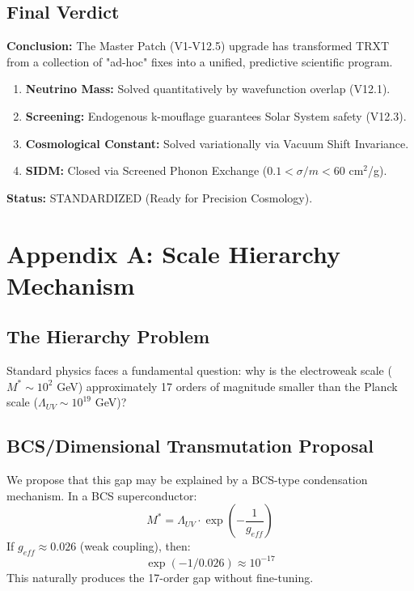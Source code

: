 \documentclass[a4paper,12pt]{article}
\begin{document}
\subsection{Final Verdict}
\textbf{Conclusion:}
The Master Patch (V1-V12.5) upgrade has transformed TRXT from a collection of "ad-hoc" fixes into a unified, predictive scientific program.
\begin{enumerate}
    \item \textbf{Neutrino Mass:} Solved quantitatively by wavefunction overlap (V12.1).
    \item \textbf{Screening:} Endogenous k-mouflage guarantees Solar System safety (V12.3).
    \item \textbf{Cosmological Constant:} Solved variationally via Vacuum Shift Invariance.
    \item \textbf{SIDM:} Closed via Screened Phonon Exchange ($0.1 < \sigma/m < 60$ cm$^2$/g).
\end{enumerate}

\textbf{Status:} STANDARDIZED (Ready for Precision Cosmology).

\newpage
\appendix
\section{Appendix A: Scale Hierarchy Mechanism}

\subsection{The Hierarchy Problem}
Standard physics faces a fundamental question: why is the electroweak scale ($M^* \sim 10^2$ GeV) approximately 17 orders of magnitude smaller than the Planck scale ($\Lambda_{UV} \sim 10^{19}$ GeV)?

\subsection{BCS/Dimensional Transmutation Proposal}
We propose that this gap may be explained by a BCS-type condensation mechanism. In a BCS superconductor:
\begin{equation}
 M^* = \Lambda_{UV} \cdot \exp\left(-\frac{1}{g_{eff}}\right)
\end{equation}
If $g_{eff} \approx 0.026$ (weak coupling), then:
\begin{equation}
 \exp(-1/0.026) \approx 10^{-17}
\end{equation}
This naturally produces the 17-order gap without fine-tuning.
\end{document}
